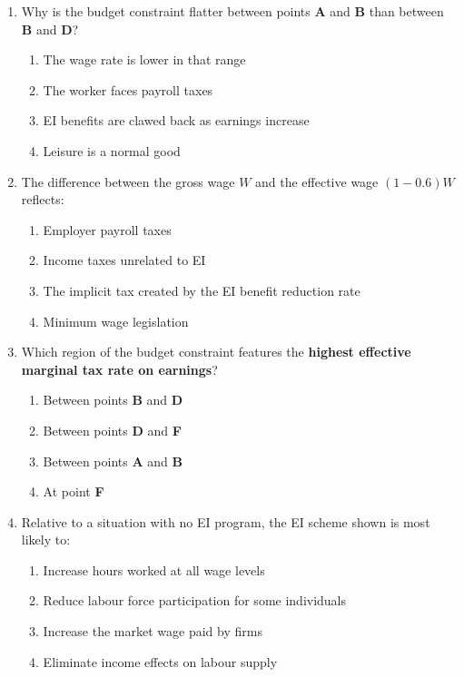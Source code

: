 \documentclass[11pt]{article}
\begin{document}
\begin{enumerate}
\item Why is the budget constraint flatter between points \textbf{A} and \textbf{B} than between \textbf{B} and \textbf{D}?

\begin{enumerate}
\item The wage rate is lower in that range  
\item The worker faces payroll taxes  
\item EI benefits are clawed back as earnings increase  
\item Leisure is a normal good  
\end{enumerate}

\item The difference between the gross wage \( W \) and the effective wage \( (1 - 0.6)W \) reflects:

\begin{enumerate}
\item Employer payroll taxes  
\item Income taxes unrelated to EI  
\item The implicit tax created by the EI benefit reduction rate  
\item Minimum wage legislation  
\end{enumerate}

\item Which region of the budget constraint features the \textbf{highest effective marginal tax rate on earnings}?

\begin{enumerate}
\item Between points \textbf{B} and \textbf{D}  
\item Between points \textbf{D} and \textbf{F}  
\item Between points \textbf{A} and \textbf{B}  
\item At point \textbf{F}  
\end{enumerate}

\item Relative to a situation with no EI program, the EI scheme shown is most likely to:

\begin{enumerate}
\item Increase hours worked at all wage levels  
\item Reduce labour force participation for some individuals  
\item Increase the market wage paid by firms  
\item Eliminate income effects on labour supply  
\end{enumerate}


\end{enumerate}
\end{document}
